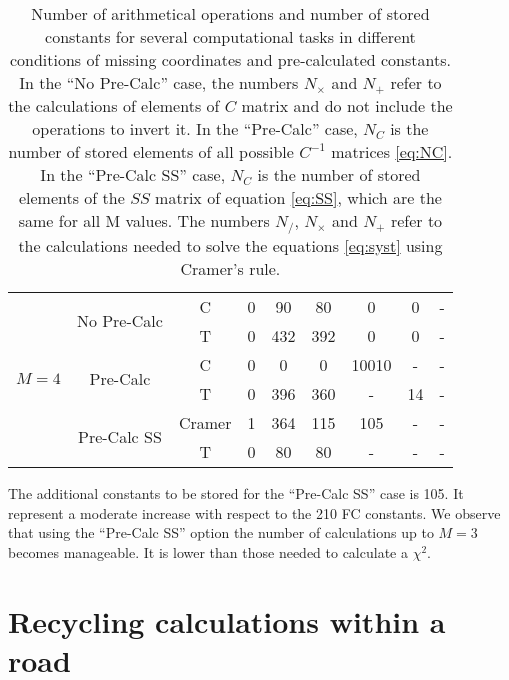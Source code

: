 \documentclass[a4paper,11pt]{article}
\begin{document}
\begin{table}[htb]
\begin{tabular}{|c|c|c|c|c|c|c|c|c|}
    \multirow{6}{*}{$M=4$} & \multirow{2}{*}{No Pre-Calc}& C & 0 & 90 & 80& 0& 0& - \\
    && T & 0 & 432 & 392 & 0 & 0 & - \\
    \cline{2-9}
    &\multirow{2}{*}{Pre-Calc}& C & 0 & 0 & 0 & 10010 & - & - \\
    && T & 0 & 396 & 360 & - & 14 &-\\
    \cline{2-9}
    &\multirow{2}{*}{Pre-Calc SS}& Cramer & 1 & 364 & 115 & 105 & - & - \\
    && T & 0 & 80 & 80 & - & - &-\\
    \hline
  \end{tabular}
  \caption{Number of arithmetical operations and number of stored
    constants for several computational  tasks in different conditions
  of missing coordinates and pre-calculated constants.
  In the ``No Pre-Calc'' case, the numbers $N_\times$ and $N_+$ refer to the
  calculations of elements of $C$ matrix and do not include the operations to invert it.
  In the ``Pre-Calc'' case, $N_C$ is the number of stored elements 
  of all possible $C^{-1}$ matrices \eqref{eq:NC}. 
  In the ``Pre-Calc SS'' case, $N_C$ is the number of stored elements 
  of the $SS$ matrix of equation \eqref{eq:SS},
  which are the same for all M values.
  The numbers $N_/$, $N_\times$ and $N_+$ refer to the
  calculations needed to solve the equations \eqref{eq:syst} using Cramer's rule.}
   \label{tab:numbers}
\end{table}

The additional constants to be stored for the ``Pre-Calc SS'' case is 105. It represent a moderate increase with respect to the 210 FC constants.
We observe that using the ``Pre-Calc SS'' option the number of calculations up to $M=3$ becomes manageable. It is lower than those needed to calculate a $\chi^2$.

\clearpage
\newpage
\section{Recycling calculations within a road}
\label{sec:recycle}
\end{document}

